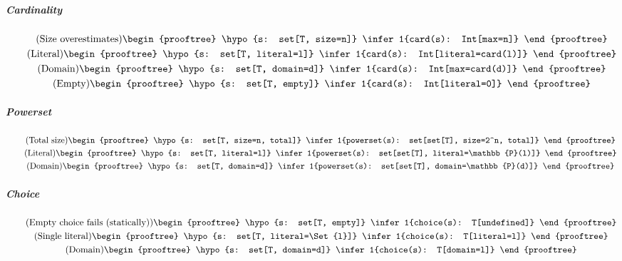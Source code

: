 \subparagraph{Cardinality}
\begin{gather}
  \tag{Size overestimates}
  \begin{prooftree}
    \hypo{s: set[T, size=n]}
    \infer1{card(s): Int[max=n]}
  \end{prooftree}
  \\
  \tag{Literal}
  \begin{prooftree}
    \hypo{s: set[T, literal=l]}
    \infer1{card(s): Int[literal=card(l)]}
  \end{prooftree}
  \\
  \tag{Domain}
  \begin{prooftree}
    \hypo{s: set[T, domain=d]}
    \infer1{card(s): Int[max=card(d)]}
  \end{prooftree}
  \\
  \tag{Empty}
  \begin{prooftree}
    \hypo{s: set[T, empty]}
    \infer1{card(s): Int[literal=0]}
  \end{prooftree}
\end{gather}
\subparagraph{Powerset}
\begin{gather}
  \tag{Total size}
  \begin{prooftree}
    \hypo{s: set[T, size=n, total]}
    \infer1{powerset(s): set[set[T], size=2^n, total]}
  \end{prooftree}
  \\
  \tag{Literal}
  \begin{prooftree}
    \hypo{s: set[T, literal=l]}
    \infer1{powerset(s): set[set[T], literal=\mathbb{P}(l)]}
  \end{prooftree}
  \\
  \tag{Domain}
  \begin{prooftree}
    \hypo{s: set[T, domain=d]}
    \infer1{powerset(s): set[set[T], domain=\mathbb{P}(d)]}
  \end{prooftree}
\end{gather}
\subparagraph{Choice}
\begin{gather}
  \tag{Empty choice fails (statically)}
  \begin{prooftree}
    \hypo{s: set[T, empty]}
    \infer1{choice(s): T[undefined]}
  \end{prooftree}
  \\
  \tag{Single literal}
  \begin{prooftree}
    \hypo{s: set[T, literal=\Set{l}]}
    \infer1{choice(s): T[literal=l]}
  \end{prooftree}
  \\
  \tag{Domain}
  \begin{prooftree}
    \hypo{s: set[T, domain=d]}
    \infer1{choice(s): T[domain=l]}
  \end{prooftree}
\end{gather}

